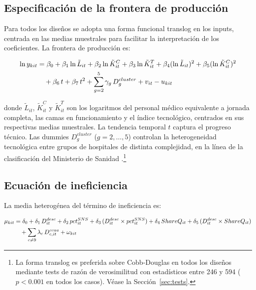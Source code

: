 \documentclass[12pt, a4paper]{article}
\begin{document}
\subsection{Especificación de la frontera de producción}

Para todos los diseños se adopta una forma funcional
translog en los inputs, centrada en las medias
muestrales para facilitar la interpretación de los
coeficientes. La frontera de producción es:

\begin{align}
  \ln y_{kit} &= \beta_0
    + \beta_1 \ln\tilde{L}_{it}
    + \beta_2 \ln\tilde{K}^C_{it}
    + \beta_3 \ln\tilde{K}^T_{it}
    + \beta_4 (\ln\tilde{L}_{it})^2
    + \beta_5 (\ln\tilde{K}^C_{it})^2
    \notag \\
    &\quad
    + \beta_6\, t
    + \beta_7\, t^2
    + \sum_{g=2}^{5} \gamma_g\, D^{cluster}_g
    + v_{it} - u_{kit}
  \label{eq:frontera_tl}
\end{align}

donde $\tilde{L}_{it}$, $\tilde{K}^C_{it}$ y
$\tilde{K}^T_{it}$ son los logaritmos del personal
médico equivalente a jornada completa, las camas en
funcionamiento y el índice tecnológico, centrados en sus
respectivas medias muestrales. La tendencia temporal $t$
captura el progreso técnico. Las dummies
$D^{cluster}_{g}$ ($g = 2, \ldots, 5$) controlan la
heterogeneidad tecnológica entre grupos de hospitales
de distinta complejidad, en la línea de la clasificación
del Ministerio de Sanidad \citep{ministerio2007}.\footnote{
  La forma translog es preferida sobre Cobb-Douglas en
  todos los diseños mediante tests de razón de
  verosimilitud con estadísticos entre 246 y 594
  ($p < 0.001$ en todos los casos). Véase la
  Sección~\ref{sec:tests}.}

\subsection{Ecuación de ineficiencia}

La media heterogénea del término de ineficiencia es:

\begin{align}
  \mu_{kit} &= \delta_0
    + \delta_1\, D^{desc}_{it}
    + \delta_2\, pct^{SNS}_{it}
    + \delta_3\, (D^{desc}_{it} \times pct^{SNS}_{it})
    + \delta_4\, ShareQ_{it}
    + \delta_5\, (D^{desc}_{it} \times ShareQ_{it})
    \notag \\
    &\quad + \sum_{c \neq 9} \lambda_c\, D^{ccaa}_{c,it}
    + \omega_{kit}
  \label{eq:uhet}
\end{align}
\end{document}
